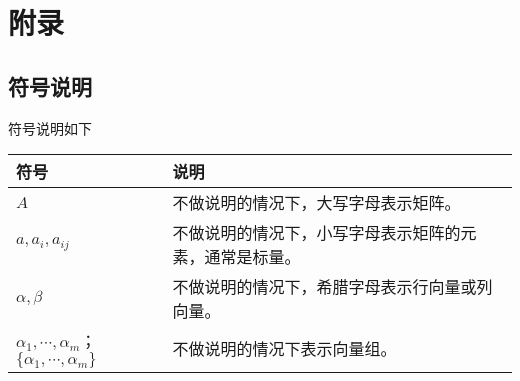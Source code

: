 \appendix

\chapter{附录}

\section{符号说明}

符号说明如下

\begin{table}[!hbt]
    \centering
    \begin{tabular}{p{2cm}p{8cm}}
        \toprule
        符号 & 说明 \\
        \midrule
        $A$ & 不做说明的情况下，大写字母表示矩阵。 \\
        $a,a_i,a_{ij}$ & 不做说明的情况下，小写字母表示矩阵的元素，通常是标量。 \\
        $\alpha,\beta$ & 不做说明的情况下，希腊字母表示行向量或列向量。 \\
        $\alpha_1,\cdots,\alpha_m$；$\{\alpha_1,\cdots,\alpha_m\}$ & 不做说明的情况下表示向量组。 \\
        \bottomrule
    \end{tabular}
\end{table}

